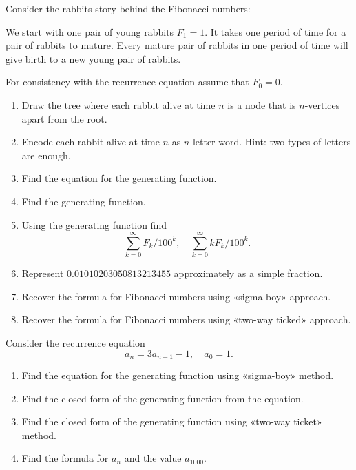 \documentclass[12pt]{article}
\begin{document}
\begin{exercise}
    Consider the rabbits story behind the Fibonacci numbers:

    We start with one pair of young rabbits $F_1 = 1$. 
    It takes one period of time for a pair of rabbits to mature. 
    Every mature pair of rabbits in one period of time will give birth to a new young pair of rabbits. 

    For consistency with the recurrence equation assume that $F_0 = 0$.

    \begin{enumerate}[label=\alph*)]
        \item Draw the tree where each rabbit alive at time $n$ is a node that is $n$-vertices apart from the root. 
        \item Encode each rabbit alive at time $n$ as $n$-letter word. Hint: two types of letters are enough. 
        \item Find the equation for the generating function. 
        \item Find the generating function.
        \item Using the generating function find
        \[
        \sum_{k=0}^{\infty} F_k / 100^k, \quad \sum_{k=0}^{\infty} k F_k / 100^k.
        \]
        \item Represent $0.01010203050813213455$ approximately as a simple fraction.  
        \item Recover the formula for Fibonacci numbers using «sigma-boy» approach.
        \item Recover the formula for Fibonacci numbers using «two-way ticked» approach.
    \end{enumerate}
\end{exercise}


\begin{exercise}
    Consider the recurrence equation
    \[
    a_n =  3a_{n-1} - 1, \quad a_0 = 1.
    \]
    \begin{enumerate}[label=\alph*)]
        \item Find the equation for the generating function using «sigma-boy» method. 
        \item Find the closed form of the generating function from the equation. 
        \item Find the closed form of the generating function using «two-way ticket» method.
        \item Find the formula for $a_n$ and the value $a_{1000}$.
    \end{enumerate}
\end{exercise}
\end{document}
